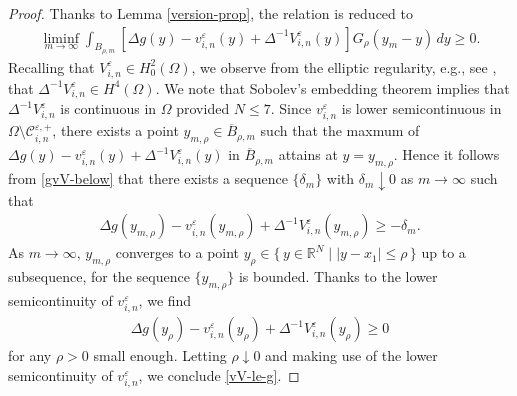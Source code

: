 \documentclass[12pt]{amsart}
\begin{document}
\begin{proof}
Thanks to Lemma \ref{version-prop}, the relation is reduced to 
\begin{align} \label{gvV-below}
\liminf_{m \to \infty} \int_{B_{\rho,m}} \left[ \Delta g(y) - v^{\varepsilon}_{i,n}(y) + \Delta^{-1} V^{\varepsilon}_{i,n}(y) \right] G_{\rho}(y_{m}-y) \, dy \ge 0. 
\end{align}
Recalling that $V^{\varepsilon}_{i,n} \in H^{2}_{0}(\Omega)$, we observe from the elliptic regularity, e.g., see \cite{GT}, 
that $\Delta^{-1}V^{\varepsilon}_{i,n} \in H^{4}(\Omega)$. 
We note that Sobolev's embedding theorem implies that $\Delta^{-1} V^{\varepsilon}_{i,n}$ is continuous in $\Omega$ provided $N \le 7$. 
Since $v^{\varepsilon}_{i,n}$ is lower semicontinuous in $\Omega \setminus {\mathcal{C}}^{{\varepsilon},+}_{i,n}$, 
there exists a point $y_{m,\rho} \in {\overline{{B}}}_{\rho,m}$ such that the maxmum of 
$\Delta g(y) - v^{\varepsilon}_{i,n}(y) + \Delta^{-1} V^{\varepsilon}_{i,n}(y)$ in ${\overline{{B}}}_{\rho,m}$ attains at $y=y_{m,\rho}$. 
Hence it follows from \eqref{gvV-below} that there exists a sequence $\{ {\delta}_{m}\}$ with ${\delta}_{m} \downarrow 0$ as $m \to \infty$ such that 
\begin{align*}
\Delta g(y_{m,\rho}) - v^{\varepsilon}_{i,n}(y_{m,\rho}) + \Delta^{-1} V^{\varepsilon}_{i,n}(y_{m,\rho}) \ge - {\delta}_{m}. 
\end{align*}
As $m \to \infty$, $y_{m,\rho}$ converges to a point $y_{\rho} \in \{\, y \in {\mathbb{R}}^{N} \mid | y - x_{1}| \le \rho \,\}$ up to a subsequence, 
for the sequence $\{ y_{m,\rho} \}$ is bounded. 
Thanks to the lower semicontinuity of $v^{\varepsilon}_{i,n}$, we find 
\begin{align*}
\Delta g(y_{\rho}) - v^{\varepsilon}_{i,n}(y_{\rho}) + \Delta^{-1} V^{\varepsilon}_{i,n}(y_{\rho}) \ge 0 
\end{align*}
for any $\rho>0$ small enough. 
Letting $\rho \downarrow 0$ and making use of the lower semicontinuity of $v^{\varepsilon}_{i,n}$, we conclude \eqref{vV-le-g}.  
\end{proof}
\end{document}
